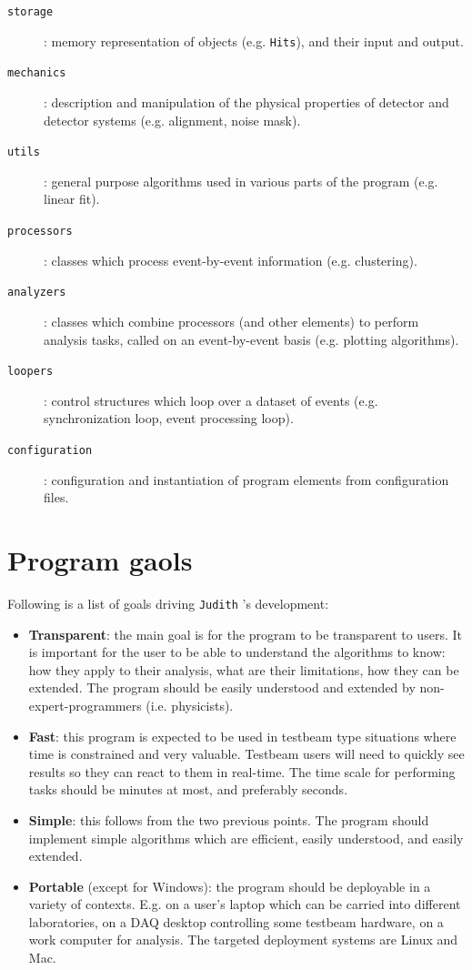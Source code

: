 \documentclass[10pt,a4paper]{book}
\newcommand{\Judith}{\Verb`Judith` }
\begin{document}
\begin{description}
	\item[\Verb`storage`]: memory representation of objects (e.g. \Verb`Hits`), and their input and output.
	\item[\Verb`mechanics`]: description and manipulation of the physical properties of detector and detector systems (e.g. alignment, noise mask).
	\item[\Verb`utils`]: general purpose algorithms used in various parts of the program (e.g. linear fit).
	\item[\Verb`processors`]: classes which process event-by-event information (e.g. clustering).
	\item[\Verb`analyzers`]: classes which combine processors (and other elements) to perform analysis tasks, called on an event-by-event basis (e.g. plotting algorithms).
	\item[\Verb`loopers`]: control structures which loop over a dataset of events (e.g. synchronization loop, event processing loop).
	\item[\Verb`configuration`]: configuration and instantiation of program elements from configuration files.
\end{description}

\section{Program gaols}

Following is a list of goals driving \Judith's development:

\begin{itemize}
	\item \textbf{Transparent}: the main goal is for the program to be transparent to users. It is important for the user to be able to understand the algorithms to know: how they apply to their analysis, what are their limitations, how they can be extended. The program should be easily understood and extended by non-expert-programmers (i.e. physicists).
	\item \textbf{Fast}: this program is expected to be used in testbeam type situations where time is constrained and very valuable. Testbeam users will need to quickly see results so they can react to them in real-time. The time scale for performing tasks should be minutes at most, and preferably seconds.
	\item \textbf{Simple}: this follows from the two previous points. The program should implement simple algorithms which are efficient, easily understood, and easily extended.
	\item \textbf{Portable} (except for Windows): the program should be deployable in a variety of contexts. E.g. on a user's laptop which can be carried into different laboratories, on a DAQ desktop controlling some testbeam hardware, on a work computer for analysis. The targeted deployment systems are Linux and Mac.
\end{itemize}
\end{document}
